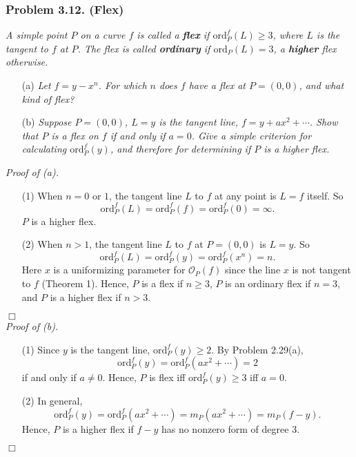 \documentclass{article}
\begin{document}
\subsubsection*{Problem 3.12. (Flex)}
\emph{A simple point $P$ on a curve $f$ is called a \textbf{flex} if $\mathrm{ord}^{f}_P(L) \geq 3$,
where $L$ is the tangent to $f$ at $P$.
The flex is called \textbf{ordinary} if $\mathrm{ord}_P(L) = 3$,
a \textbf{higher} flex otherwise.}
\begin{enumerate}
\item[(a)]
  \emph{Let $f = y - x^n$.
  For which $n$ does $f$ have a flex at $P = (0, 0)$, and what kind of flex?}

\item[(b)]
  \emph{Suppose $P = (0, 0)$, $L = y$ is the tangent line,
  $f = y + a x^2 + \cdots$.
  Show that $P$ is a flex on $f$ if and only if $a = 0$.
  Give a simple criterion for calculating $\mathrm{ord}^{f}_P(y)$,
  and therefore for determining if $P$ is a higher flex.} \\
\end{enumerate}



\emph{Proof of (a).}
\begin{enumerate}
\item[(1)]
  When $n = 0$ or $1$, the tangent line $L$ to $f$ at any point is $L = f$ itself.
  So
  \[
    \mathrm{ord}^{f}_P(L)
    = \mathrm{ord}^{f}_P(f)
    = \mathrm{ord}^{f}_P(0)
    = \infty.
  \]
  $P$ is a higher flex.

\item[(2)]
  When $n > 1$, the tangent line $L$ to $f$ at $P = (0,0)$ is $L = y$.
  So
  \[
    \mathrm{ord}^{f}_P(L)
    = \mathrm{ord}^{f}_P(y)
    = \mathrm{ord}^{f}_P(x^n)
    = n.
  \]
  Here $x$ is a uniformizing parameter for $\mathscr{O}_P(f)$
  since the line $x$ is not tangent to $f$ (Theorem 1).
  Hence, $P$ is a flex if $n \geq 3$,
  $P$ is an ordinary flex if $n = 3$, and
  $P$ is a higher flex if $n > 3$.
\end{enumerate}
$\Box$ \\



\emph{Proof of (b).}
\begin{enumerate}
\item[(1)]
  Since $y$ is the tangent line, $\mathrm{ord}^{f}_P(y) \geq 2$.
  By Problem 2.29(a),
  \[
    \mathrm{ord}^{f}_P(y)
    = \mathrm{ord}^{f}_P(ax^2 + \cdots)
    = 2
  \]
  if and only if $a \neq 0$.
  Hence, $P$ is flex iff $\mathrm{ord}^{f}_P(y) \geq 3$ iff $a = 0$.

\item[(2)]
  In general,
  \[
    \mathrm{ord}^{f}_P(y)
    = \mathrm{ord}^{f}_P(ax^2 + \cdots)
    = m_P(ax^2 + \cdots)
    = m_P(f - y).
  \]
  Hence, $P$ is a higher flex if $f - y$ has no nonzero form of degree $3$.
\end{enumerate}
$\Box$ \\\\
\end{document}
